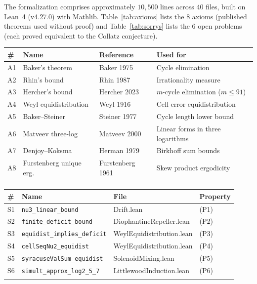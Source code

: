 \documentclass{CUP-JNL-FMP}%
\theoremstyle{definition}
\numberwithin{equation}{section}
\begin{document}
The formalization comprises approximately $10{,}500$ lines across $40$ files,
built on Lean~4 (v4.27.0) with Mathlib. Table~\ref{tab:axioms} lists the
$8$ axioms (published theorems used without proof) and Table~\ref{tab:sorrys}
lists the $6$ open problems (each proved equivalent to the Collatz conjecture).

\begin{table}[t]
\tabcolsep=4pt
{\begin{fntable}
\begin{tabular*}{\textwidth}{@{\extracolsep{\fill}}llll@{}}
\toprule
\# & Name & Reference & Used for \\
\midrule
A1 & Baker's theorem & Baker 1975 & Cycle elimination \\
A2 & Rhin's bound & Rhin 1987 & Irrationality measure \\
A3 & Hercher's bound & Hercher 2023 & $m$-cycle elimination ($m \leq 91$) \\
A4 & Weyl equidistribution & Weyl 1916 & Cell error equidistribution \\
A5 & Baker--Steiner & Steiner 1977 & Cycle length lower bound \\
A6 & Matveev three-log & Matveev 2000 & Linear forms in three logarithms \\
A7 & Denjoy--Koksma & Herman 1979 & Birkhoff sum bounds \\
A8 & Furstenberg unique erg. & Furstenberg 1961 & Skew product ergodicity \\
\botrule
\end{tabular*}
\end{fntable}}
\end{table}

\begin{table}[t]
\tabcolsep=4pt
{\begin{fntable}
\begin{tabular*}{\textwidth}{@{\extracolsep{\fill}}llll@{}}
\toprule
\# & Name & File & Property \\
\midrule
S1 & \texttt{nu3\_linear\_bound} & Drift.lean & (P1) \\
S2 & \texttt{finite\_deficit\_bound} & DiophantineRepeller.lean & (P2) \\
S3 & \texttt{equidist\_implies\_deficit} & WeylEquidistribution.lean & (P3) \\
S4 & \texttt{cellSeqNu2\_equidist} & WeylEquidistribution.lean & (P4) \\
S5 & \texttt{syracuseValSum\_equidist} & SolenoidMixing.lean & (P5) \\
S6 & \texttt{simult\_approx\_log2\_5\_7} & LittlewoodInduction.lean & (P6) \\
\botrule
\end{tabular*}
\end{fntable}}
\end{table}
\end{document}
